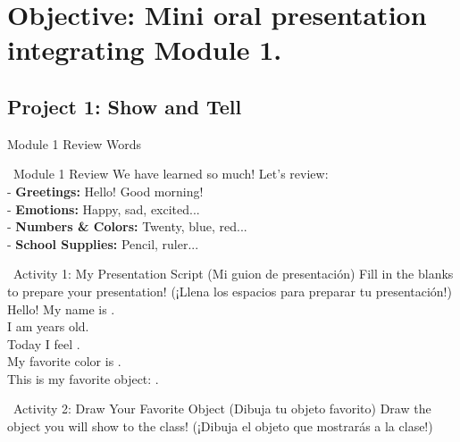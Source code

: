 \section*{Objective: Mini oral presentation integrating Module 1.}

\subsection*{Project 1: Show and Tell}

\begin{vocabcard}{Module 1 Review Words}
\end{vocabcard}

\begin{grammartip}{ \ Module 1 Review}
  We have learned so much! Let's review:\\
  - \textbf{Greetings:} Hello! Good morning!\\
  - \textbf{Emotions:} Happy, sad, excited...\\
  - \textbf{Numbers \& Colors:} Twenty, blue, red...\\
  - \textbf{School Supplies:} Pencil, ruler...
\end{grammartip}

\begin{activity}{ \ Activity 1: My Presentation Script (Mi guion de presentación)}
  Fill in the blanks to prepare your presentation! (¡Llena los espacios para preparar tu presentación!)\\[1em]
  Hello! My name is \answerline[4cm].\\
  I am \answerline[2cm] years old.\\
  Today I feel \answerline[3cm].\\
  My favorite color is \answerline[3cm].\\
  This is my favorite object: \answerline[4cm].
\end{activity}

\begin{activity}{ \ Activity 2: Draw Your Favorite Object (Dibuja tu objeto favorito)}
  Draw the object you will show to the class! (¡Dibuja el objeto que mostrarás a la clase!)\\[1em]
  \vspace{4cm}
\end{activity}

